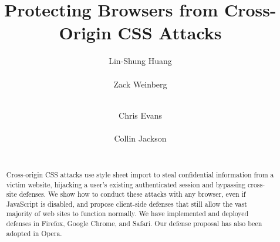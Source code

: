 \documentclass{acm_proc_article-sp}
\begin{document}
\itemsep 0pt
\partopsep 0pt
\topsep 0pt
\makeatletter
\def\paragraph{%
    \@startsection{paragraph}{4}{\z@}{\z@ \@plus \p@}{-5\p@}{\subsecfnt}}
\makeatother
\renewenvironment{itemize}{%
 \begin{list}{$\bullet$}
  {\setlength{\itemsep}{0pt}
   \setlength{\parsep}{3pt}
   \setlength{\topsep}{3pt}
   \setlength{\partopsep}{0pt}
   \setlength{\leftmargin}{1.5em}
   \setlength{\labelwidth}{1em}
   \setlength{\labelsep}{0.5em}}}
  {\end{list}}

\title{Protecting Browsers from Cross-Origin CSS Attacks}
\author{
\alignauthor
Lin-Shung Huang\\
      \\
\alignauthor
Zack Weinberg\\
      \\
\and
\alignauthor
Chris Evans\\
      \\
\alignauthor
Collin Jackson\\
      \\
}

\newcommand{\todo}[1]{\textbf{[TODO: #1]}}

\maketitle
\begin{abstract}
Cross-origin CSS attacks use style sheet import to steal confidential
information from a victim website, hijacking a user's existing
authenticated session and bypassing cross-site defenses.  We show how
to conduct these attacks with any browser, even if JavaScript is
disabled, and propose client-side defenses that still allow the vast
majority of web sites to function normally. We have implemented and
deployed defenses in Firefox, Google Chrome, and Safari. Our defense
proposal has also been adopted in Opera.
\end{abstract}
\end{document}
